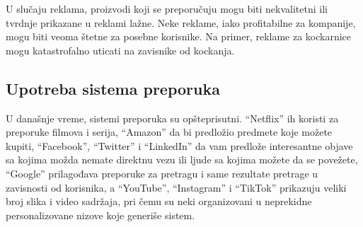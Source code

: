 \documentclass[a4paper]{article}
\begin{document}
U slučaju reklama, proizvodi koji se preporučuju mogu biti nekvalitetni ili tvrdnje prikazane u reklami lažne. Neke reklame, iako profitabilne za kompanije, mogu biti veoma štetne za posebne korisnike. Na primer, reklame za kockarnice mogu katastrofalno uticati na zavisnike od kockanja.

\subsection{Upotreba sistema preporuka}
\label{subsec:upotreba_sistema_preporuka}

U današnje vreme, sistemi preporuka su opšteprisutni. ``Netflix'' ih koristi za preporuke filmova i serija, ``Amazon'' da bi predložio predmete koje možete kupiti, ``Facebook'', ``Twitter'' i ``LinkedIn'' da vam predlože interesantne objave sa kojima možda nemate direktnu vezu ili ljude sa kojima možete da se povežete, ``Google'' prilagođava preporuke za pretragu i same rezultate pretrage u zavisnosti od korisnika, a ``YouTube'', ``Instagram'' i ``TikTok'' prikazuju veliki broj slika i video sadržaja, pri čemu su neki organizovani u neprekidne personalizovane nizove koje generiše sistem.

\appendix
 

\end{document}
